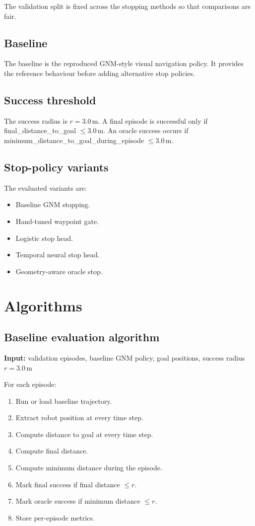 \documentclass[conference]{IEEEtran}
\begin{document}
The validation split is fixed across the stopping methods so that comparisons are fair.

\subsection{Baseline}
The baseline is the reproduced GNM-style visual navigation policy. It provides the reference behaviour before adding alternative stop policies.

\subsection{Success threshold}
The success radius is $r = 3.0$\,m. A final episode is successful only if final\_distance\_to\_goal $\le 3.0$\,m. An oracle success occurs if minimum\_distance\_to\_goal\_during\_episode $\le 3.0$\,m.

\subsection{Stop-policy variants}
The evaluated variants are:
\begin{itemize}
    \item Baseline GNM stopping.
    \item Hand-tuned waypoint gate.
    \item Logistic stop head.
    \item Temporal neural stop head.
    \item Geometry-aware oracle stop.
\end{itemize}

\section{Algorithms}

\subsection{Baseline evaluation algorithm}
\textbf{Input:} validation episodes, baseline GNM policy, goal positions, success radius $r=3.0$\,m

For each episode:
\begin{enumerate}
    \item Run or load baseline trajectory.
    \item Extract robot position at every time step.
    \item Compute distance to goal at every time step.
    \item Compute final distance.
    \item Compute minimum distance during the episode.
    \item Mark final success if final distance $\le r$.
    \item Mark oracle success if minimum distance $\le r$.
    \item Store per-episode metrics.
\end{enumerate}
\end{document}
